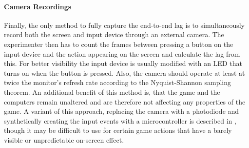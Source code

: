 


\paragraph{Camera Recordings}
Finally, the only method to fully capture the end-to-end lag is to simultaneously record both the screen and input device through an external camera. The experimenter then has to count the frames between pressing a button on the input device and the action appearing on the screen and calculate the lag from this. For better visibility the input device is usually modified with an LED that turns on when the button is pressed. Also, the camera should operate at least at twice the monitor's refresh rate according to the Nyquist-Shannon sampling theorem. An additional benefit of this method is, that the game and the computers remain unaltered and are therefore not affecting any properties of the game. A variant of this approach, replacing the camera with a photodiode and synthetically creating the input events with a microcontroller is described in \cite{beyermethod}, though it may be difficult to use for certain game actions that have a barely visible or unpredictable on-screen effect.





